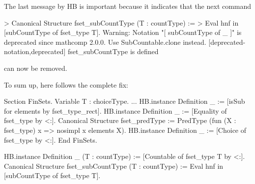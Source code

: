 \documentclass{article}
\def\hb{\textsc{HB}}
\begin{document}
The last message by \hb{} is important because it indicates that the next command
\begin{failure}
> Canonical Structure fset_subCountType (T : countType) :=
>  Eval hnf in [subCountType of fset_type T].
Warning: Notation "[ subCountType of _ ]" is deprecated since mathcomp 2.0.0.
Use SubCountable.clone instead.
[deprecated-notation,deprecated]
fset_subCountType is defined
\end{failure}
can now be removed.

To sum up, here follows the complete fix:
\begin{success}
Section FinSets.
 Variable T : choiceType.
 ...
 HB.instance Definition _ := [isSub for elements by fset_type_rect].
 HB.instance Definition _ := [Equality of fset_type by <:].
 Canonical Structure fset_predType := PredType (fun (X : fset_type) x => nosimpl x \in elements X).
 HB.instance Definition _ := [Choice of fset_type by <:].
End FinSets.

HB.instance Definition _ (T : countType) := [Countable of fset_type T by <:].
Canonical Structure fset_subCountType (T : countType) :=
  Eval hnf in [subCountType of fset_type T].
\end{success}




\end{document}
